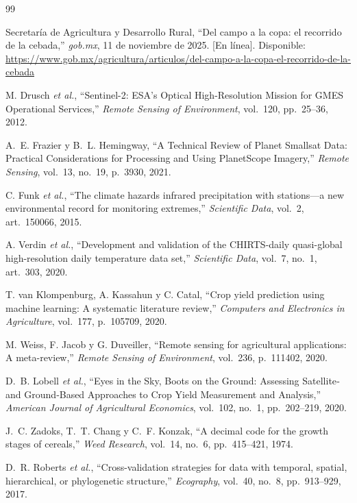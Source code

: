 \begin{thebibliography}{99}

Secretaría de Agricultura y Desarrollo Rural, ``Del campo a la copa: el recorrido de la cebada,'' \emph{gob.mx}, 11 de noviembre de 2025. [En línea]. Disponible: \url{https://www.gob.mx/agricultura/articulos/del-campo-a-la-copa-el-recorrido-de-la-cebada}

M. Drusch \emph{et al.}, ``Sentinel-2: ESA's Optical High-Resolution Mission for GMES Operational Services,'' \emph{Remote Sensing of Environment}, vol.~120, pp.~25--36, 2012.

A.~E. Frazier y B.~L. Hemingway, ``A Technical Review of Planet Smallsat Data: Practical Considerations for Processing and Using PlanetScope Imagery,'' \emph{Remote Sensing}, vol.~13, no.~19, p.~3930, 2021.

C. Funk \emph{et al.}, ``The climate hazards infrared precipitation with stations---a new environmental record for monitoring extremes,'' \emph{Scientific Data}, vol.~2, art.~150066, 2015.

A. Verdin \emph{et al.}, ``Development and validation of the CHIRTS-daily quasi-global high-resolution daily temperature data set,'' \emph{Scientific Data}, vol.~7, no.~1, art.~303, 2020.

T. van Klompenburg, A. Kassahun y C. Catal, ``Crop yield prediction using machine learning: A systematic literature review,'' \emph{Computers and Electronics in Agriculture}, vol.~177, p.~105709, 2020.

M. Weiss, F. Jacob y G. Duveiller, ``Remote sensing for agricultural applications: A meta-review,'' \emph{Remote Sensing of Environment}, vol.~236, p.~111402, 2020.

D.~B. Lobell \emph{et al.}, ``Eyes in the Sky, Boots on the Ground: Assessing Satellite‐ and Ground‐Based Approaches to Crop Yield Measurement and Analysis,'' \emph{American Journal of Agricultural Economics}, vol.~102, no.~1, pp.~202--219, 2020.

J.~C. Zadoks, T.~T. Chang y C.~F. Konzak, ``A decimal code for the growth stages of cereals,'' \emph{Weed Research}, vol.~14, no.~6, pp.~415--421, 1974.

D.~R. Roberts \emph{et al.}, ``Cross-validation strategies for data with temporal, spatial, hierarchical, or
phylogenetic structure,'' \emph{Ecography}, vol.~40, no.~8, pp.~913--929, 2017.


\end{thebibliography}
